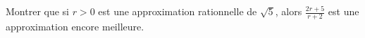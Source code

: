 Montrer que si $r > 0$ est une approximation rationnelle de $\sqrt{5}$, alors $\frac{2r+5}{r+2}$ est une approximation encore meilleure.
